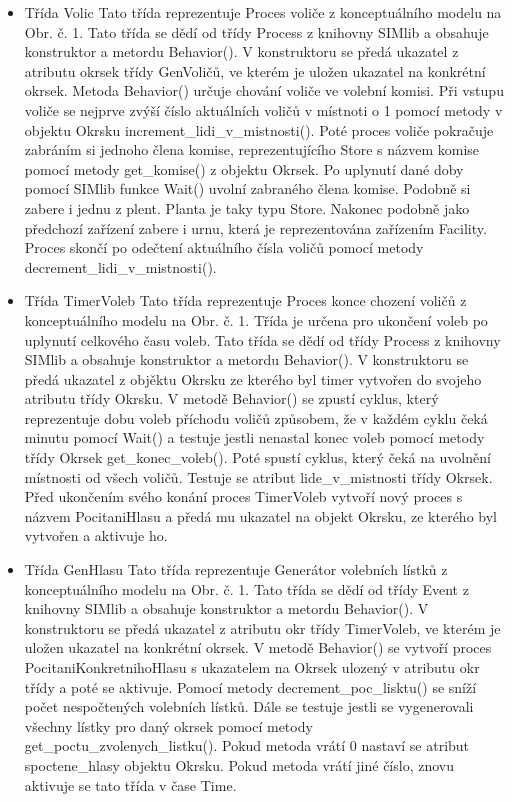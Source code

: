 \documentclass[12pt,a4paper,titlepage,final]{article}
\begin{document}
\begin{itemize}
\item Třída Volic
\subitem Tato třída reprezentuje Proces voliče z konceptuálního modelu na Obr. č. 1. Tato třída se dědí od třídy Process z knihovny SIMlib a obsahuje konstruktor a metordu Behavior(). V konstruktoru se předá ukazatel z atributu okrsek třídy GenVoličů, ve kterém je uložen ukazatel na konkrétní okrsek. Metoda Behavior() určuje chování voliče ve volební komisi. Při vstupu voliče se nejprve zvýší číslo aktuálních voličů v místnoti o 1 pomocí metody v objektu Okrsku increment\_lidi\_v\_mistnosti(). Poté proces voliče pokračuje zabráním si jednoho člena komise, reprezentujícího Store s názvem komise pomocí metody get\_komise() z objektu Okrsek. Po uplynutí dané doby pomocí SIMlib funkce Wait() uvolní zabraného člena komise. Podobně si zabere i jednu z plent. Planta je taky typu Store. Nakonec podobně jako předchozí zařízení zabere i urnu, která je reprezentována zařízením Facility. Proces skončí po odečtení aktuálního čísla voličů pomocí metody decrement\_lidi\_v\_mistnosti().

\item Třída TimerVoleb
\subitem Tato třída reprezentuje Proces konce chození voličů z konceptuálního modelu na Obr. č. 1. Třída je určena pro ukončení voleb po uplynutí celkového času voleb. Tato třída se dědí od třídy Process z knihovny SIMlib a obsahuje konstruktor a metordu Behavior(). V konstruktoru se předá ukazatel z objěktu Okrsku ze kterého byl timer vytvořen do svojeho atributu třídy Okrsku. V metodě Behavior() se zpustí cyklus, který reprezentuje dobu voleb příchodu voličů způsobem, že v každém cyklu čeká minutu pomocí Wait() a testuje jestli nenastal konec voleb pomocí metody třídy Okrsek get\_konec\_voleb(). Poté spustí cyklus, který čeká na uvolnění místnosti od všech voličů. Testuje se atribut lide\_v\_mistnosti třídy Okrsek. Před ukončením svého konání proces TimerVoleb vytvoří nový proces s názvem PocitaniHlasu a předá mu ukazatel na objekt Okrsku, ze kterého byl vytvořen a aktivuje ho.

\item Třída GenHlasu
\subitem Tato třída reprezentuje Generátor volebních lístků z konceptuálního modelu na Obr. č. 1. Tato třída se dědí od třídy Event z knihovny SIMlib a obsahuje konstruktor a metordu Behavior(). V konstruktoru se předá ukazatel z atributu okr třídy TimerVoleb, ve kterém je uložen ukazatel na konkrétní okrsek. V metodě Behavior() se vytvoří proces PocitaniKonkretnihoHlasu s ukazatelem na Okrsek ulozený v atributu okr třídy a poté se aktivuje. Pomocí metody decrement\_poc\_lisktu() se sníží počet nespočtených volebních lístků. Dále se testuje jestli se vygenerovali všechny lístky pro daný okrsek pomocí metody get\_poctu\_zvolenych\_listku(). Pokud metoda vrátí 0 nastaví se atribut spoctene\_hlasy objektu Okrsku. Pokud metoda vrátí jiné číslo, znovu aktivuje se tato třída v čase Time.


\end{itemize}
\end{document}

